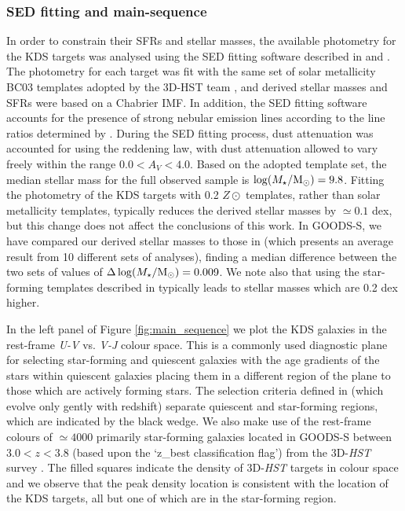 \documentclass[fleqn,usenatbib]{mnras}
\begin{document}
\subsubsection{SED fitting and main-sequence}\label{subsubsec:sed_fitting}
In order to constrain their SFRs and stellar masses, the available photometry for the KDS targets was analysed using the SED fitting software described in \cite{McLure2011} and \cite{McLeod2015}.
The photometry for each target was fit with the same set of solar metallicity BC03 \citep{Bruzual2003} templates adopted by the 3D-HST team \cite{Momcheva2016}, and derived stellar masses and SFRs were based on a Chabrier IMF.
In addition, the SED fitting software accounts for the presence of strong nebular emission lines according to the line ratios determined by \cite{Cullen2014}.
During the SED fitting process, dust attenuation was accounted for using the \cite{Calzetti2000} reddening law, with dust attenuation allowed to vary freely within the range $0.0<A_{V}<4.0$.
Based on the adopted template set, the median stellar mass for the full observed sample is $\log(M_{\star}/{\rm M}_{\odot}) = 9.8$. 
Fitting the photometry of the KDS targets with 0.2 $Z\odot$ templates, rather than solar metallicity templates, typically reduces the derived stellar masses by $\simeq0.1$ dex, but this change does not affect the conclusions of this work.
In GOODS-S, we have compared our derived stellar masses to those in \cite{Santini2015} (which presents an average result from 10 different sets of analyses), finding a median difference between the two sets of values of $\Delta \log(M_{\star}/{\rm M}_{\odot}) = 0.009$.
We note also that using the star-forming templates described in \cite{Wuyts2011} typically leads to stellar masses which are 0.2 dex higher. 

In the left panel of Figure \ref{fig:main_sequence} we plot the KDS galaxies in the rest-frame {\it U-V} vs. {\it V-J} colour space.
This is a commonly used diagnostic plane for selecting star-forming and quiescent galaxies \citep[e.g.][]{Williams2009,Brammer2011,Whitaker2012a} with the age gradients of the stars within quiescent galaxies placing them in a different region of the plane to those which are actively forming stars.
The selection criteria defined in \cite{Whitaker2012a} (which evolve only gently with redshift) separate quiescent and star-forming regions, which are indicated by the black wedge.
We also make use of the rest-frame colours of $\simeq4000$ primarily star-forming galaxies located in GOODS-S between $3.0 < z < 3.8$ (based upon the `z\_best classification flag') from the 3D-{\em HST} survey \citep{Brammer2012,Momcheva2016}.
The filled squares indicate the density of 3D-{\em HST} targets in colour space and we observe that the peak density location is consistent with the location of the KDS targets, all but one of which are in the star-forming region. 
\end{document}

